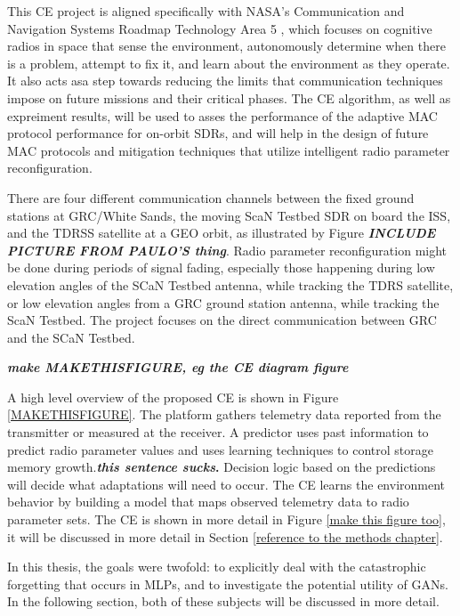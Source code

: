 	\par This CE project is aligned specifically with NASA's Communication and Navigation Systems Roadmap Technology Area 5 \cite{somecitation}, which focuses on cognitive radios in space that sense the environment, autonomously determine when there is a problem, attempt to fix it, and learn about the environment as they operate. It also acts asa step towards reducing the limits that communication techniques impose on future missions and their critical phases. The CE algorithm, as well as expreiment results, will be used to asses the performance of the adaptive MAC protocol performance for on-orbit SDRs, and will help in the design of future MAC protocols and mitigation techniques that utilize intelligent radio parameter reconfiguration. 
	\par There are four different communication channels between the fixed ground stations at GRC/White Sands, the moving ScaN Testbed SDR on board the ISS, and the TDRSS satellite at a GEO orbit, as illustrated by Figure \textbf{\textit{INCLUDE PICTURE FROM PAULO'S thing}}. Radio parameter reconfiguration might be done during periods of signal fading, especially those happening during low elevation angles of the SCaN Testbed antenna, while tracking the TDRS satellite, or low elevation angles from a GRC ground station antenna, while tracking the ScaN Testbed. The project focuses on the direct communication between GRC and the SCaN Testbed.
	\par\textbf{\textit{make MAKETHISFIGURE, eg the CE diagram figure}}
	\par A high level overview of the proposed CE is shown in Figure \ref{MAKETHISFIGURE}. The platform gathers telemetry data reported from the transmitter or measured at the receiver. A predictor uses past information to predict radio parameter values and uses learning techniques to control storage memory growth.\textbf{\textit{this sentence sucks}.} Decision logic based on the predictions will decide what adaptations will need to occur. The CE learns the environment behavior by building a model that maps observed telemetry data to radio parameter sets. The CE is shown in more detail in Figure \ref{make this figure too}, it will be discussed in more detail in Section \ref{reference to the methods chapter}.
	\par In this thesis, the goals were twofold: to explicitly deal with the catastrophic forgetting that occurs in MLPs, and to investigate the potential utility of GANs. In the following section, both of these subjects will be discussed in more detail.
	
